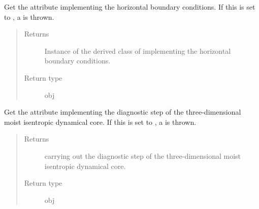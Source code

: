 \documentclass[letterpaper,10pt,english]{sphinxmanual}
\begin{document}
\begin{fulllineitems}
\begin{fulllineitems}
\begin{quote}
\begin{description}
\end{description}\end{quote}

\end{fulllineitems}


\begin{fulllineitems}
\label{\detokenize{api:dycore.prognostic_isentropic.PrognosticIsentropic.boundary}}
Get the attribute implementing the horizontal boundary conditions.
If this is set to , a  is thrown.
\begin{quote}\begin{description}
\item[{Returns}] \leavevmode
Instance of the derived class of {\hyperref[\detokenize{api:dycore.horizontal_boundary.HorizontalBoundary}]{}} implementing
the horizontal boundary conditions.

\item[{Return type}] \leavevmode
obj

\end{description}\end{quote}

\end{fulllineitems}


\begin{fulllineitems}
\label{\detokenize{api:dycore.prognostic_isentropic.PrognosticIsentropic.diagnostic}}
Get the attribute implementing the diagnostic step of the three-dimensional moist isentropic dynamical core.
If this is set to , a  is thrown.
\begin{quote}\begin{description}
\item[{Returns}] \leavevmode
{\hyperref[\detokenize{api:dycore.diagnostic_isentropic.DiagnosticIsentropic}]{}} carrying out the diagnostic step of the
three-dimensional moist isentropic dynamical core.

\item[{Return type}] \leavevmode
obj

\end{description}\end{quote}


\end{fulllineitems}
\end{fulllineitems}
\end{document}
